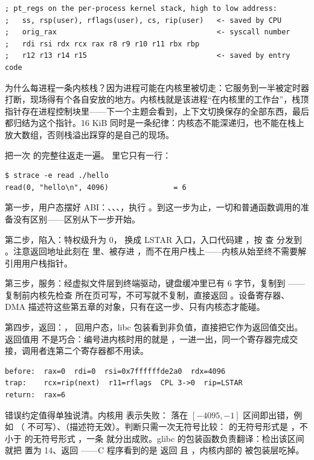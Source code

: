 \begin{lstlisting}
; pt_regs on the per-process kernel stack, high to low address:
;   ss, rsp(user), rflags(user), cs, rip(user)   <- saved by CPU
;   orig_rax                                     <- syscall number
;   rdi rsi rdx rcx rax r8 r9 r10 r11 rbx rbp
;   r12 r13 r14 r15                              <- saved by entry code
\end{lstlisting}

为什么每进程一条内核栈？因为进程可能在内核里被切走：它服务到一半被定时器打断，现场得有个各自安放的地方。内核栈就是该进程“在内核里的工作台”，栈顶指针存在进程控制块里——下一个主题会看到，上下文切换保存的全部东西，最后都归结为这个指针。16 KiB 同时是一条纪律：内核态不能深递归，也不能在栈上放大数组，否则栈溢出踩穿的是自己的现场。

把一次  的完整往返走一遍。 里它只有一行：

\begin{lstlisting}
$ strace -e read ./hello
read(0, "hello\n", 4096)               = 6
\end{lstlisting}

第一步，用户态摆好 ABI：、、、，执行 。到这一步为止，一切和普通函数调用的准备没有区别——区别从下一步开始。

第二步，陷入：特权级升为 0， 换成 LSTAR 入口，入口代码建 ，按  查  分发到 。注意返回地址此刻在  里、被存进 ，而不在用户栈上——内核从始至终不需要解引用用户栈指针。

第三步，服务：经虚拟文件层到终端驱动，键盘缓冲里已有 6 字节，复制到 ——复制前内核先检查  所在页可写，不可写就不复制，直接返回 。设备寄存器、DMA 描述符这些第五章的对象，只有在这一步、只有内核态才能碰。

第四步，返回：， 回用户态，libc 包装看到非负值，直接把它作为返回值交出。返回值用  不是巧合：编号进内核时用的就是 ，一进一出，同一个寄存器完成交接，调用者连第二个寄存器都不用读。

\begin{lstlisting}
before:  rax=0  rdi=0  rsi=0x7ffffffde2a0  rdx=4096
trap:    rcx=rip(next)  r11=rflags  CPL 3->0  rip=LSTAR
return:  rax=6
\end{lstlisting}

错误约定值得单独说清。内核用  表示失败： 落在 $[-4095,-1]$ 区间即出错，例如 （ 不可写）、（描述符无效）。判断只需一次无符号比较： 的无符号形式是 ，不小于  的无符号形式 ，一条  就分出成败。glibc 的包装函数负责翻译：检出该区间就把  置为 14、返回 ——C 程序看到的是  返回  且 ，内核内部的  被包装层吃掉。

